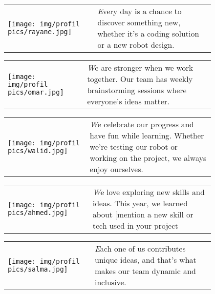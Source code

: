\begin{figure}[H]
   
    \begin{tabular}{m{} m{}}
        \texttt{[image: img/profil pics/rayane.jpg]} & 
        \textit Every day is a chance to discover something new, whether it’s a coding solution or a new robot design.
    \end{tabular}
\end{figure}




\begin{figure}[H]
   
    \begin{tabular}{m{} m{}}
        \texttt{[image: img/profil pics/omar.jpg]} & 
        \textit We are stronger when we work together. Our team has weekly brainstorming sessions where everyone’s ideas matter.
    \end{tabular}
\end{figure}


\begin{figure}[H]
   
    \begin{tabular}{m{} m{}}
        \texttt{[image: img/profil pics/walid.jpg]} & 
        \textit We celebrate our progress and have fun while learning. Whether we’re testing our robot or working on the project, we always enjoy ourselves.
    \end{tabular}
\end{figure}


\begin{figure}[H]
   
    \begin{tabular}{m{} m{}}
        \texttt{[image: img/profil pics/ahmed.jpg]} & 
        \textit We love exploring new skills and ideas. This year, we learned about [mention a new skill or tech used in your project
    \end{tabular}
\end{figure}



\begin{figure}[H]
   
    \begin{tabular}{m{} m{}}
        \texttt{[image: img/profil pics/salma.jpg]} & 
        \textit Each one of us contributes unique ideas, and that’s what makes our team dynamic and inclusive.
    \end{tabular}
\end{figure}

